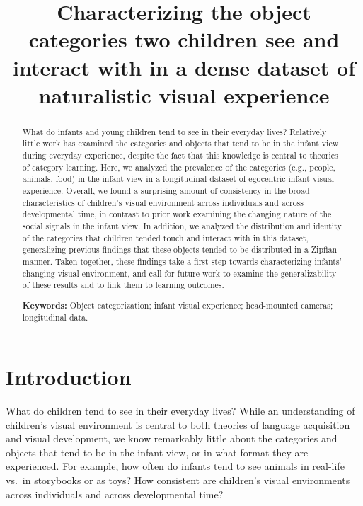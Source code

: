 \documentclass[10pt, letterpaper]{article}
\title{Characterizing the object categories two children see and interact with
in a dense dataset of naturalistic visual experience}
\author{}
\begin{document}
\maketitle

\begin{abstract}
What do infants and young children tend to see in their everyday lives?
Relatively little work has examined the categories and objects that tend
to be in the infant view during everyday experience, despite the fact
that this knowledge is central to theories of category learning. Here,
we analyzed the prevalence of the categories (e.g., people, animals,
food) in the infant view in a longitudinal dataset of egocentric infant
visual experience. Overall, we found a surprising amount of consistency
in the broad characteristics of children's visual environment across
individuals and across developmental time, in contrast to prior work
examining the changing nature of the social signals in the infant view.
In addition, we analyzed the distribution and identity of the categories
that children tended touch and interact with in this dataset,
generalizing previous findings that these objects tended to be
distributed in a Zipfian manner. Taken together, these findings take a
first step towards characterizing infants' changing visual environment,
and call for future work to examine the generalizability of these
results and to link them to learning outcomes.

\textbf{Keywords:}
Object categorization; infant visual experience; head-mounted cameras;
longitudinal data.
\end{abstract}

\hypertarget{introduction}{%
\section{Introduction}\label{introduction}}

What do children tend to see in their everyday lives? While an
understanding of children's visual environment is central to both
theories of language acquisition and visual development, we know
remarkably little about the categories and objects that tend to be in
the infant view, or in what format they are experienced. For example,
how often do infants tend to see animals in real-life vs.~in storybooks
or as toys? How consistent are children's visual environments across
individuals and across developmental time?
\end{document}
